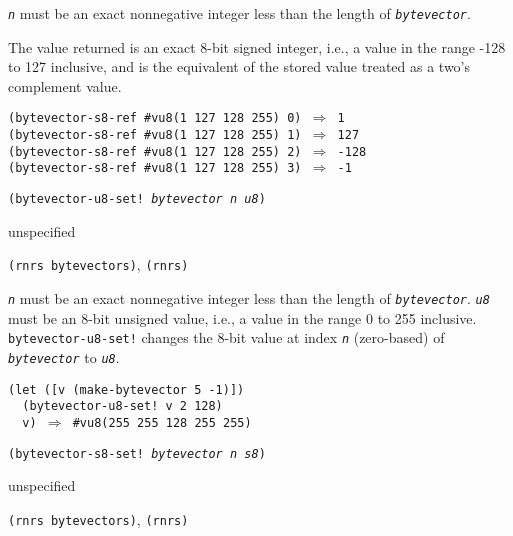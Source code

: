 \texttt{\textit{n}} must be an exact nonnegative integer less than
the length of \texttt{\textit{bytevector}}.

The value returned is an exact 8-bit signed integer, i.e., a value in
the range -128 to 127 inclusive, and is the equivalent of the
stored value treated as a two's complement value.


\begin{alltt}
(bytevector-s8-ref \#{}vu8(1 127 128 255) 0) \(\Rightarrow\) 1
(bytevector-s8-ref \#{}vu8(1 127 128 255) 1) \(\Rightarrow\) 127
(bytevector-s8-ref \#{}vu8(1 127 128 255) 2) \(\Rightarrow\) -128
(bytevector-s8-ref \#{}vu8(1 127 128 255) 3) \(\Rightarrow\) -1
\end{alltt}

\begin{description}

\label{objects_s250}\item[procedure] \texttt{(bytevector-u8-set! \textit{bytevector} \textit{n} \textit{u8})}



\item[returns] unspecified


\item[libraries] \texttt{(rnrs bytevectors)}, \texttt{(rnrs)}
\end{description}

\texttt{\textit{n}} must be an exact nonnegative integer less than
the length of \texttt{\textit{bytevector}}.
\texttt{\textit{u8}} must be an 8-bit unsigned value, i.e., a value in the range
0 to 255 inclusive.
\texttt{bytevector-u8-set!} changes the 8-bit value at index \texttt{\textit{n}} (zero-based)
of \texttt{\textit{bytevector}} to \texttt{\textit{u8}}.

\begin{alltt}
(let ([v (make-bytevector 5 -1)])
  (bytevector-u8-set! v 2 128)
  v) \(\Rightarrow\) \#{}vu8(255 255 128 255 255)
\end{alltt}

\begin{description}

\label{objects_s251}\item[procedure] \texttt{(bytevector-s8-set! \textit{bytevector} \textit{n} \textit{s8})}



\item[returns] unspecified


\item[libraries] \texttt{(rnrs bytevectors)}, \texttt{(rnrs)}
\end{description}


